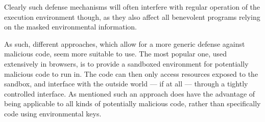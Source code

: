 \documentclass[a4paper]{scrreprt}
\begin{document}
Clearly such defense mechanisms will often interfere with regular operation of
the execution environment though, as they also affect all benevolent programs
relying on the masked environmental information.

As such, different approaches, which allow for a more generic defense against
malicious code, seem more suitable to use. The most popular one, used
extensively in browsers, is to provide a sandboxed environment for potentially
malicious code to run in. The code can then only access resources exposed to
the sandbox, and interface with the outside world --- if at all --- through a
tightly controlled interface. As mentioned such an approach does have the
advantage of being applicable to all kinds of potentially malicious code,
rather than specifically code using environmental keys.

\printbibliography
\end{document}
